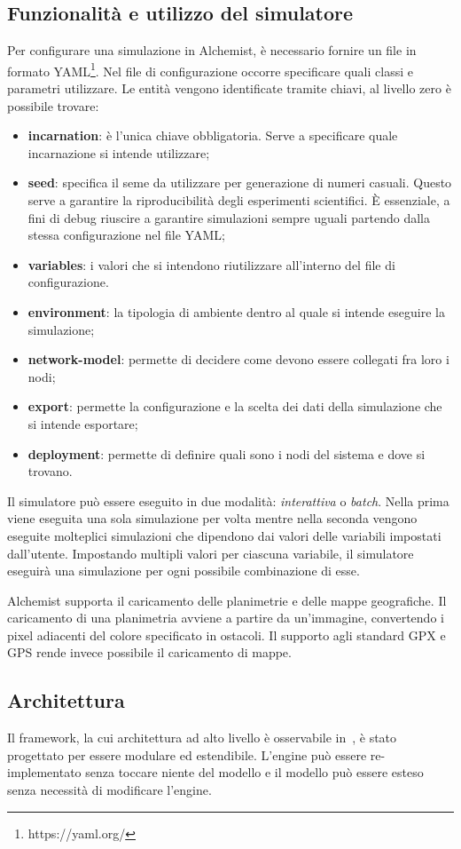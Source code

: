 \documentclass[12pt,a4paper,openright,twoside]{book}
\begin{document}
\subsection{Funzionalità e utilizzo del simulatore}
Per configurare una simulazione in Alchemist, è necessario fornire un file in formato YAML\footnote{https://yaml.org/}. Nel file di configurazione occorre specificare quali classi e parametri utilizzare. Le entità vengono identificate tramite chiavi, al livello zero è possibile trovare: 
\begin{itemize}
    \item \textbf{incarnation}: è l'unica chiave obbligatoria. Serve a specificare quale incarnazione si intende utilizzare; 
    \item \textbf{seed}: specifica il seme da utilizzare per generazione di numeri casuali. Questo serve a garantire la riproducibilità degli esperimenti scientifici. È essenziale, a fini di debug riuscire a garantire simulazioni sempre uguali partendo dalla stessa configurazione nel file YAML;
    \item \textbf{variables}: i valori che si intendono riutilizzare all'interno del file di configurazione. 
    \item \textbf{environment}: la tipologia di ambiente dentro al quale si intende eseguire la simulazione;
    \item \textbf{network-model}: permette di decidere come devono essere collegati fra loro i nodi;
    \item \textbf{export}: permette la configurazione e la scelta dei dati della simulazione che si intende esportare; 
    \item \textbf{deployment}: permette di definire quali sono i nodi del sistema e dove si trovano. 
\end{itemize}
Il simulatore può essere eseguito in due modalità: \textit{interattiva} o \textit{batch}. Nella prima viene eseguita una sola simulazione per volta mentre nella seconda vengono eseguite molteplici simulazioni che dipendono dai valori delle variabili impostati dall'utente. Impostando multipli valori per ciascuna variabile, il simulatore eseguirà una simulazione per ogni possibile combinazione di esse. 

Alchemist supporta il caricamento delle planimetrie e delle mappe geografiche. Il caricamento di una planimetria avviene a partire da un'immagine, convertendo i pixel adiacenti del colore specificato in ostacoli. Il supporto agli standard GPX e GPS rende invece possibile il caricamento di mappe. 
\subsection{Architettura}
Il framework, la cui architettura ad alto livello è osservabile in~, è stato progettato per essere modulare ed estendibile. L'engine può essere re-implementato senza toccare niente del modello e il modello può essere esteso senza necessità di modificare l'engine. 
\end{document}
